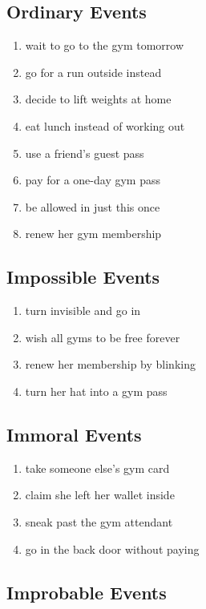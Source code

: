 \documentclass[11pt,letterpaper]{article}
\begin{document}
\subsection{ Ordinary Events}

\begin{enumerate}[resume]
    \item wait to go to the gym tomorrow
    \item go for a run outside instead
    \item decide to lift weights at home
    \item eat lunch instead of working out
    \item use a friend's guest pass
    \item pay for a one-day gym pass
    \item be allowed in just this once
    \item renew her gym membership
\end{enumerate}

\subsection{Impossible Events}

\begin{enumerate}[resume]
    \item turn invisible and go in
    \item wish all gyms to be free forever
    \item renew her membership by blinking
    \item turn her hat into a gym pass
\end{enumerate}

\subsection{Immoral Events}

\begin{enumerate}[resume]
    \item  take someone else's gym card
    \item claim she left her wallet inside
    \item sneak past the gym attendant
    \item go in the back door without paying
\end{enumerate}

\subsection{Improbable Events}
\end{document}

